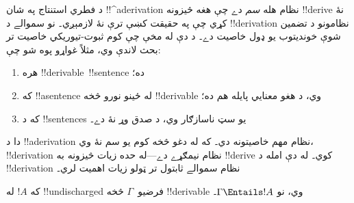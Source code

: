 \documentclass[../../../include/open-logic-section]{subfiles}
\begin{document}
      {}
      {}
      

\begin{explain}
د فطري استنتاج په شان !!^a{derivation} نظام هله \emph{سم} دے چې
هغه څيزونه !!{derive} نۀ کړي چې په حقيقت کښې ترې نۀ لازمېږي۔
نو سموالے د !!{derivation} نظامونو د تضمين شوې خونديتوب يو ډول
خاصيت دے۔ د دې له مخې چې کوم ثبوت-تيوريکي خاصيت تر بحث لاندې وي،
مثلاً غواړو پوه شو چې:
\begin{enumerate}
\item هره !!{derivable}~!!{sentence}  ده؛
\item که !!a{sentence} له ځينو نورو څخه !!{derivable} وي، د هغو
  معنايي پايله هم ده؛
\item که د !!{sentence}s يو سټ ناسازګار وي، د صدق وړ نۀ دے۔
\end{enumerate}
دا د !!a{derivation} نظام مهم خاصيتونه دي۔ که له دغو څخه کوم يو
سم نۀ وي، !!{derivation} نظام نيمګړے دے---له حده زيات څيزونه به
!!{derive} کوي۔ له دې امله د !!{derivation} نظام سموالے ثابتول
تر ټولو زيات اهميت لري۔
\end{explain}

\begin{thm}[سموالے]
که $!A$ له !!{undischarged} فرضيو~$\Gamma$ څخه !!{derivable} وي،
نو $\Gamma \Entails !A$۔
\end{thm}
\end{document}
